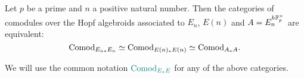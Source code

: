 \begin{proposition}
    \label{ch0:prop:comod-EE-are-equivalent}
    Let $p$ be a prime and $n$ a positive natural number. Then the categories of comodules over the Hopf algebroids associated to $E_n$, $E(n)$ and $A=E_n^{h\mathbb{F}_p^\times}$ are equivalent: 
    $$\mathrm{Comod}_{E_{n *}E_n} \simeq \mathrm{Comod}_{E(n)_*E(n)}\simeq \mathrm{Comod}_{A_*A}.$$
\end{proposition}

\begin{notation}
    We will use the common notation ${\color{teal} \mathrm{Comod}_{E_*E}}$ for any of the above categories. 
\end{notation}
